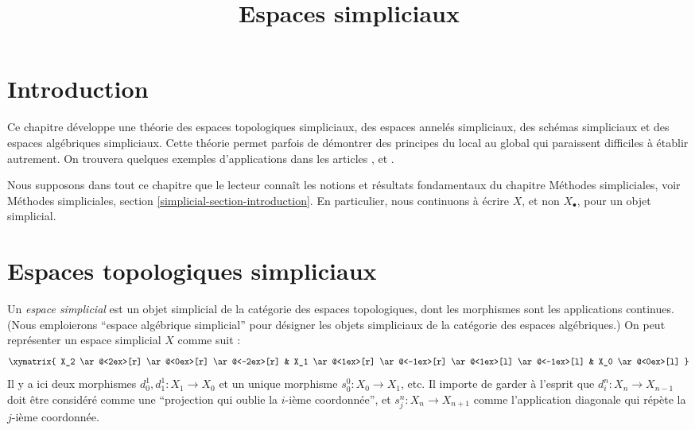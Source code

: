 

%


\title{Espaces simpliciaux}


\maketitle

\label{section-phantom}

\tableofcontents

\section{Introduction}
\label{section-introduction}

\noindent
Ce chapitre développe une théorie des espaces topologiques simpliciaux, des
espaces annelés simpliciaux, des schémas simpliciaux et des espaces
algébriques simpliciaux. Cette théorie permet parfois de démontrer des principes
du local au global qui paraissent difficiles à établir autrement.
On trouvera quelques exemples d'applications dans les articles
\cite{faltings_finiteness}, \cite{Kiehl} et \cite{HodgeIII}.

\medskip\noindent
Nous supposons dans tout ce chapitre que le lecteur connaît les notions et
résultats fondamentaux du chapitre Méthodes simpliciales, voir
Méthodes simpliciales, section \ref{simplicial-section-introduction}.
En particulier, nous continuons à écrire $X$, et non $X_\bullet$,
pour un objet simplicial.








\section{Espaces topologiques simpliciaux}
\label{section-simplicial-top}

\noindent
Un {\it espace simplicial} est un objet simplicial de la catégorie des
espaces topologiques, dont les morphismes sont les applications continues.
(Nous emploierons ``espace algébrique simplicial'' pour désigner les objets
simpliciaux de la catégorie des espaces algébriques.)
On peut représenter un espace simplicial $X$ comme suit :
$$
\xymatrix{
X_2
\ar@<2ex>[r]
\ar@<0ex>[r]
\ar@<-2ex>[r]
&
X_1
\ar@<1ex>[r]
\ar@<-1ex>[r]
\ar@<1ex>[l]
\ar@<-1ex>[l]
&
X_0
\ar@<0ex>[l]
}
$$
Il y a ici deux morphismes $d^1_0, d^1_1 : X_1 \to X_0$
et un unique morphisme $s^0_0 : X_0 \to X_1$, etc.
Il importe de garder à l'esprit que $d^n_i : X_n \to X_{n - 1}$
doit être considéré comme une ``projection qui oublie la
$i$-ième coordonnée'', et $s^n_j : X_n \to X_{n + 1}$ comme l'application
diagonale qui répète la $j$-ième coordonnée.

